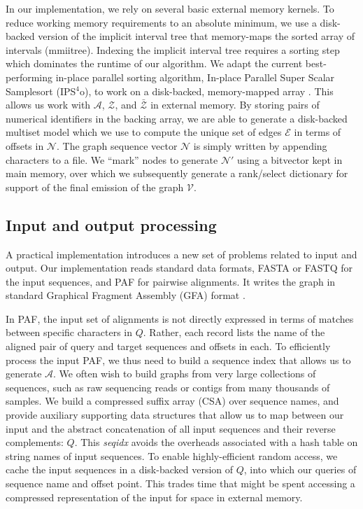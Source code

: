 \documentclass{bioinfo}
\theoremstyle{definition}
\begin{document}
In our implementation, we rely on several basic external memory kernels.
To reduce working memory requirements to an absolute minimum, we use a disk-backed version of the implicit interval tree that memory-maps the sorted array of intervals (mmiitree).
Indexing the implicit interval tree requires a sorting step which dominates the runtime of our algorithm.
We adapt the current best-performing in-place parallel sorting algorithm, In-place Parallel Super Scalar Samplesort (IPS$^4$o), to work on a disk-backed, memory-mapped array \citep{axtmann2017}.
This allows us work with $\mathcal{A}$, $\mathcal{Z}$, and $\bar{\mathcal{Z}}$ in external memory.
By storing pairs of numerical identifiers in the backing array, we are able to generate a disk-backed multiset model which we use to compute the unique set of edges $\mathcal{E}$ in terms of offsets in $\mathcal{N}$.
The graph sequence vector $\mathcal{N}$ is simply written by appending characters to a file.
We ``mark'' nodes to generate $\mathcal{N}'$ using a bitvector kept in main memory, over which we subsequently generate a rank/select dictionary \cite{Gog_2014} for support of the final emission of the graph $\mathcal{V}$.

\subsection{Input and output processing}

A practical implementation introduces a new set of problems related to input and output. %
Our implementation reads standard data formats, FASTA or FASTQ for the input sequences, and PAF \citep{Li_2018} for pairwise alignments.
It writes the graph in standard Graphical Fragment Assembly (GFA) format \citep{GFA}.

In PAF, the input set of alignments is not directly expressed in terms of matches between specific characters in $Q$.
Rather, each record lists the name of the aligned pair of query and target sequences and offsets in each.
To efficiently process the input PAF, we thus need to build a sequence index that allows us to generate $\mathcal{A}$.
We often wish to build graphs from very large collections of sequences, such as raw sequencing reads or contigs from many thousands of samples.
We build a compressed suffix array (CSA) \citep{Sadakane_2000} over sequence names, and provide auxiliary supporting data structures that allow us to map between our input and the abstract concatenation of all input sequences and their reverse complements: $Q$.
This \textit{seqidx} avoids the overheads associated with a hash table on string names of input sequences.
To enable highly-efficient random access, we cache the input sequences in a disk-backed version of $Q$, into which our queries of sequence name and offset point.
This trades time that might be spent accessing a compressed representation of the input for space in external memory.
\end{document}

